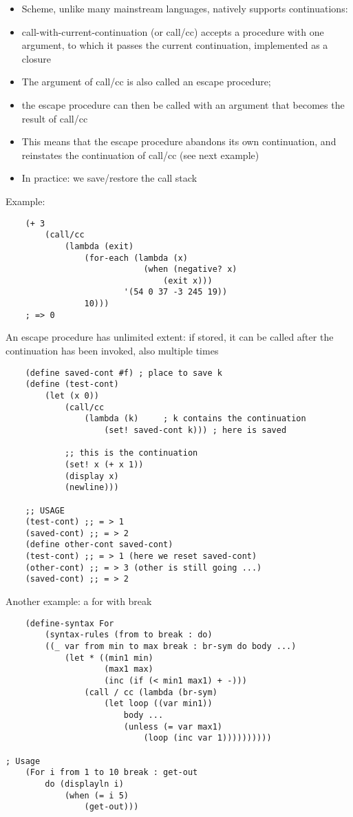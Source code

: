 \begin{itemize}
    \item Scheme, unlike many mainstream languages, natively supports continuations:
    \item call-with-current-continuation (or call/cc) accepts a procedure with one argument, to which it passes the current continuation, implemented as a closure
    \item The argument of call/cc is also called an escape procedure;
    \item the escape procedure can then be called with an argument that becomes the result of call/cc
    \item This means that the escape procedure abandons its own continuation, and reinstates the continuation of call/cc (see next example)
    \item In practice: we save/restore the call stack
\end{itemize}
Example:
\begin{lstlisting}
    (+ 3
        (call/cc
            (lambda (exit)
                (for-each (lambda (x)
                            (when (negative? x)
                                (exit x)))
                        '(54 0 37 -3 245 19))
            	10)))
    ; => 0
\end{lstlisting}
An escape procedure has unlimited extent: if stored, it can be called after the continuation has been invoked, also multiple times
\begin{lstlisting}
    (define saved-cont #f) ; place to save k
    (define (test-cont)
        (let (x 0))
            (call/cc
                (lambda (k)     ; k contains the continuation
                    (set! saved-cont k))) ; here is saved

            ;; this is the continuation        
            (set! x (+ x 1))
            (display x)
            (newline)))

    ;; USAGE
    (test-cont) ;; = > 1
    (saved-cont) ;; = > 2
    (define other-cont saved-cont)
    (test-cont) ;; = > 1 (here we reset saved-cont)
    (other-cont) ;; = > 3 (other is still going ...)
    (saved-cont) ;; = > 2

\end{lstlisting}
Another example: a for with break
\begin{lstlisting}
    (define-syntax For
        (syntax-rules (from to break : do)
        ((_ var from min to max break : br-sym do body ...)
            (let * ((min1 min)
                    (max1 max)
                    (inc (if (< min1 max1) + -)))
                (call / cc (lambda (br-sym)
                    (let loop ((var min1))
                        body ...
                        (unless (= var max1)
                            (loop (inc var 1))))))))))

; Usage
    (For i from 1 to 10 break : get-out
        do (displayln i)
            (when (= i 5)
                (get-out)))

\end{lstlisting}


